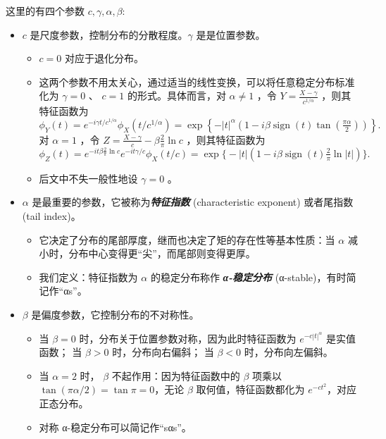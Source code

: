 这里的有四个参数 $c,\gamma,\alpha,\beta$:

\begin{itemize}
\tightlist
\item
  $c$ 是尺度参数，控制分布的分散程度。$\gamma$ 是是位置参数。

\begin{itemize}
  \tightlist
  \item
    $c=0$ 对应于退化分布。
  \item
    这两个参数不用太关心，通过适当的线性变换，可以将任意稳定分布标准化为 $\gamma=0$ 、 $c=1$ 的形式。具体而言，对 $\alpha\ne1$ ，令 $Y=\frac{X-\gamma}{c^{1/\alpha}}$ ，则其特征函数为
    \[
    \phi_Y(t)=e^{-i\gamma t/c^{1/\alpha}}\phi_X(t/c^{1/\alpha}) = \exp\left\{ -|t|^\alpha \left(1 - i\beta \operatorname{sign}(t) \tan\left(\tfrac{\pi\alpha}{2}\right)\right) \right\}.
    \]
    对 $\alpha=1$ ，令 $Z=\tfrac{X-\gamma}{c}-\beta\tfrac2\pi\ln c$ ，则其特征函数为
    \[
    \phi_Z(t)=e^{-it\beta\frac2\pi\ln c}e^{-it\gamma/c}\phi_X(t/c)=\exp\big\{-|t|\left(1 - i\beta \operatorname{sign}(t)\tfrac2\pi\ln|t|\right)\big\}.
    \]
  \item
    后文中不失一般性地设 $\gamma=0$ 。
  \end{itemize}
\item
  $\alpha$ 是最重要的参数，它被称为\textbf{\emph{特征指数}} (characteristic exponent) 或者尾指数 (tail index)。

\begin{itemize}
  \tightlist
  \item
    它决定了分布的尾部厚度，继而也决定了矩的存在性等基本性质：当 $\alpha$ 减小时，分布中心变得更``尖''，而尾部则变得更厚。
  \item
    我们定义：特征指数为 $\alpha$ 的稳定分布称作 \textbf{\emph{α-稳定分布 }} (α-stable)，有时简记作``αs''。
  \end{itemize}
\item
  $\beta$ 是偏度参数，它控制分布的不对称性。

\begin{itemize}
  \tightlist
  \item
    当 $\beta = 0$ 时，分布关于位置参数对称，因为此时特征函数为 $e^{-c|t|^\alpha}$ 是实值函数； 当 $\beta > 0$ 时，分布向右偏斜； 当 $\beta < 0$ 时，分布向左偏斜。
  \item
    当 $\alpha=2$ 时， $\beta$ 不起作用：因为特征函数中的 $\beta$ 项乘以 $\tan(\pi\alpha/2)=\tan\pi=0$，无论 $\beta$ 取何值，特征函数都化为 $e^{-c t^2}$，对应正态分布。
  \item
    对称 α-稳定分布可以简记作``sαs''。
  \end{itemize}
\end{itemize}

